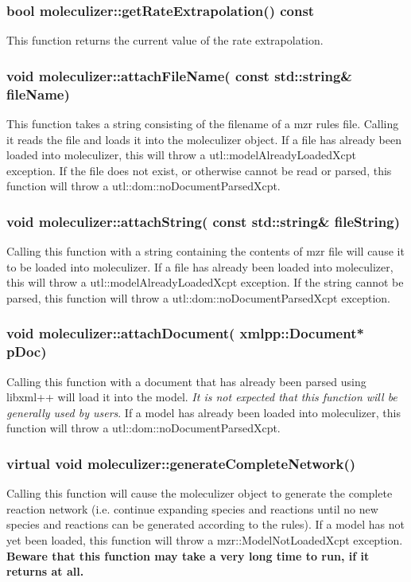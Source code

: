\subsubsection{bool moleculizer::getRateExtrapolation() const}
This function returns the current value of the rate extrapolation.

\subsubsection{void moleculizer::attachFileName( const std::string\&
  fileName)}

This function takes a string consisting of the filename of a mzr rules
file.  Calling it reads the file and loads it into the moleculizer
object.  If a file has already been loaded into moleculizer, this will
throw a utl::modelAlreadyLoadedXcpt exception.  If the file does not
exist, or otherwise cannot be read or parsed, this function will throw
a utl::dom::noDocumentParsedXcpt.

\subsubsection{void moleculizer::attachString( const std::string\&
  fileString)}
Calling this function with a string containing the contents of mzr
file will cause it to be loaded into moleculizer.  If a file has
already been loaded into moleculizer, this will throw a
utl::modelAlreadyLoadedXcpt exception.  If the string cannot be
parsed, this function will throw a utl::dom::noDocumentParsedXcpt
exception.

\subsubsection{void moleculizer::attachDocument( xmlpp::Document*
  pDoc)}
Calling this function with a document that has already been parsed
using libxml++ will load it into the model.  {\em It is not expected
  that this function will be generally used by users}.  If a model has
already been loaded into moleculizer, this function will throw a
utl::dom::noDocumentParsedXcpt. 

\subsubsection{virtual void moleculizer::generateCompleteNetwork()}
Calling this function will cause the moleculizer object to generate
the complete reaction network (i.e. continue expanding species and
reactions until no new species and reactions can be generated
according to the rules).  If a model has not yet been loaded, this
function will throw a mzr::ModelNotLoadedXcpt exception.
\textbf{Beware that this function may take a very long time to run, if
  it returns at all.}  

